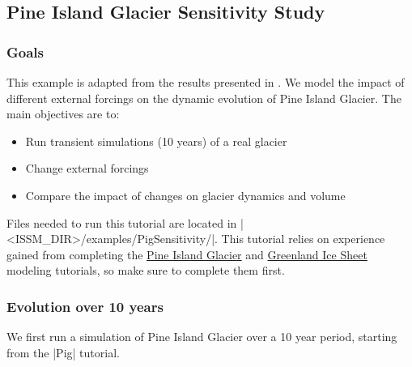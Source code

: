 
\subsection{Pine Island Glacier Sensitivity Study} \label{sec:using-issm-tutorials-pigsensitivity}
\subsubsection{Goals} %
This example is adapted from the results presented in \cite{Seroussi2014}. We model the impact of different external forcings on the dynamic evolution of Pine Island Glacier. The main objectives are to:
\begin{itemize}
	\item Run transient simulations (10 years) of a real glacier
	\item Change external forcings
	\item Compare the impact of changes on glacier dynamics and volume
\end{itemize}

Files needed to run this tutorial are located in \lstinlinebg|<ISSM_DIR>/examples/PigSensitivity/|. This tutorial relies on experience gained from completing the 
\hyperref[sec:using-issm-tutorials-pig]{Pine Island Glacier}
and 
\hyperref[sec:using-issm-tutorials-greenland]{Greenland Ice Sheet}
modeling tutorials, so make sure to complete them first.
\subsubsection{Evolution over 10 years}%
We first run a simulation of Pine Island Glacier over a 10 year period, starting from the \lstinlinebg|Pig| tutorial.

